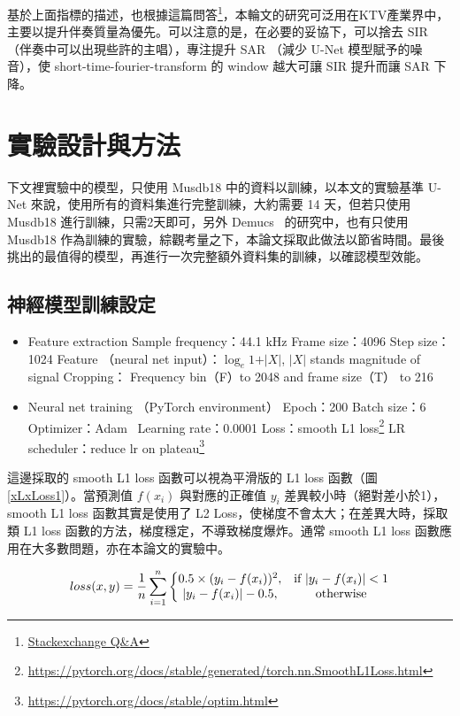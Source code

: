 基於上面指標的描述，也根據這篇問答\footnote{\href{https://dsp.stackexchange.com/questions/9610/snr-calculation-in-audio-reconstruction-and-what-is-an-acceptable-value}{Stackexchange Q\&A}}，本輪文的研究可泛用在KTV產業界中，主要以提升伴奏質量為優先。可以注意的是，在必要的妥協下，可以捨去 SIR （伴奏中可以出現些許的主唱），專注提升 SAR （減少 U-Net 模型賦予的噪音），使 short-time-fourier-transform 的 window 越大可讓 SIR 提升而讓 SAR 下降。

\section{實驗設計與方法}
下文裡實驗中的模型，只使用 Musdb18 中的資料以訓練，以本文的實驗基準 U-Net 來說，使用所有的資料集進行完整訓練，大約需要 14 天，但若只使用 Musdb18 進行訓練，只需2天即可，另外 Demucs~\cite{defossez2019music} 的研究中，也有只使用 Musdb18 作為訓練的實驗，綜觀考量之下，本論文採取此做法以節省時間。最後挑出的最值得的模型，再進行一次完整額外資料集的訓練，以確認模型效能。

\subsection{神經模型訓練設定}
\begin{itemize}
    \item Feature extraction
    \subitem Sample frequency：44.1 kHz
    \subitem Frame size：4096
    \subitem Step size：1024
    \subitem Feature （neural net input）：$\log_e{1+\vert X\vert} $, $\vert X\vert$ stands magnitude of signal
    \subitem Cropping： Frequency bin（F）to 2048 and frame size（T） to 216
    \item Neural net training （PyTorch environment）
    \subitem Epoch：200
    \subitem Batch size：6
    \subitem Optimizer：Adam~\cite{kingma2014adam}
    \subitem Learning rate：0.0001
    \subitem Loss：smooth L1 loss\footnote{\url{https://pytorch.org/docs/stable/generated/torch.nn.SmoothL1Loss.html}}
    \subitem LR scheduler：reduce lr on plateau\footnote{\url{https://pytorch.org/docs/stable/optim.html}}
\end{itemize}
這邊採取的 smooth L1 loss 函數可以視為平滑版的 L1 loss 函數（圖\ref{xLxLoss1}）。當預測值 $f(x_i)$ 與對應的正確值 $y_i$ 差異較小時（絕對差小於1），smooth L1 loss 函數其實是使用了 L2 Loss，使梯度不會太大；在差異大時，採取類 L1 loss 函數的方法，梯度穩定，不導致梯度爆炸。通常 smooth L1 loss 函數應用在大多數問題，亦在本論文的實驗中。

\begin{equation*}
    loss(x,y)=\frac{1}{n}\sum_{i=1}^{n}\left\{\begin{matrix}
        0.5 \times (y_i-f(x_i))^2,& \textup{if}\ \vert y_i-f(x_i)\vert < 1\\ 
        \vert y_i-f(x_i)\vert -0.5,& \textup{otherwise}
    \end{matrix}\right.
\end{equation*}

